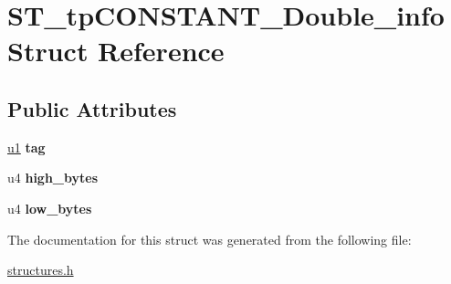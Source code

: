 \hypertarget{structST__tpCONSTANT__Double__info}{}\section{S\+T\+\_\+tp\+C\+O\+N\+S\+T\+A\+N\+T\+\_\+\+Double\+\_\+info Struct Reference}
\label{structST__tpCONSTANT__Double__info}
\subsection*{Public Attributes}
\begin{DoxyCompactItemize}
\item 
\mbox{\label{structST__tpCONSTANT__Double__info_a71259021971e977775cba824b153e0d4}} 
\mbox{\hyperlink{structures_8h_ad9f4cdb6757615aae2fad89dab3c5470}{u1}} {\bfseries tag}
\item 
\mbox{\label{structST__tpCONSTANT__Double__info_a66213f11a0d87fb6a7a327329b9b11bf}} 
u4 {\bfseries high\+\_\+bytes}
\item 
\mbox{\label{structST__tpCONSTANT__Double__info_a62d8563373dd07856a45607369acfcf3}} 
u4 {\bfseries low\+\_\+bytes}
\end{DoxyCompactItemize}


The documentation for this struct was generated from the following file\+:\begin{DoxyCompactItemize}
\item 
\mbox{\hyperlink{structures_8h}{structures.\+h}}\end{DoxyCompactItemize}
